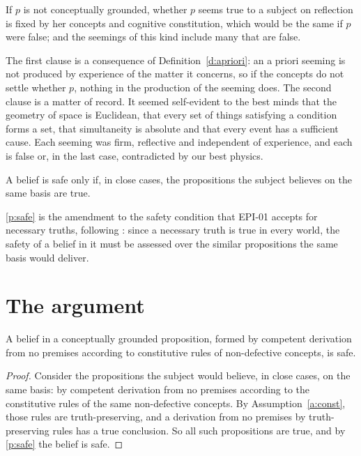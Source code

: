 \documentclass{situationist-preprint}
\begin{document}
\begin{assumption}\label{a:indiff}
If $p$ is not conceptually grounded, whether $p$ seems true to a subject on reflection is fixed by her concepts and cognitive constitution, which would be the same if $p$ were false; and the seemings of this kind include many that are false.
\end{assumption}

The first clause is a consequence of Definition~\ref{d:apriori}: an a priori seeming is not produced by experience of the matter it concerns, so if the concepts do not settle whether $p$, nothing in the production of the seeming does. The second clause is a matter of record. It seemed self-evident to the best minds that the geometry of space is Euclidean, that every set of things satisfying a condition forms a set, that simultaneity is absolute and that every event has a sufficient cause. Each seeming was firm, reflective and independent of experience, and each is false or, in the last case, contradicted by our best physics.

\begin{principle}\label{p:safe}
A belief is safe only if, in close cases, the propositions the subject believes on the same basis are true.
\end{principle}

\ref{p:safe} is the amendment to the safety condition that EPI-01 accepts for necessary truths, following \citet{Pritchard2005}: since a necessary truth is true in every world, the safety of a belief in it must be assessed over the similar propositions the same basis would deliver.

\section{The argument}

\begin{lemma}\label{l:deriv}
A belief in a conceptually grounded proposition, formed by competent derivation from no premises according to constitutive rules of non-defective concepts, is safe.
\end{lemma}

\begin{proof}
Consider the propositions the subject would believe, in close cases, on the same basis: by competent derivation from no premises according to the constitutive rules of the same non-defective concepts. By Assumption~\ref{a:const}, those rules are truth-preserving, and a derivation from no premises by truth-preserving rules has a true conclusion. So all such propositions are true, and by \ref{p:safe} the belief is safe.
\end{proof}
\end{document}
